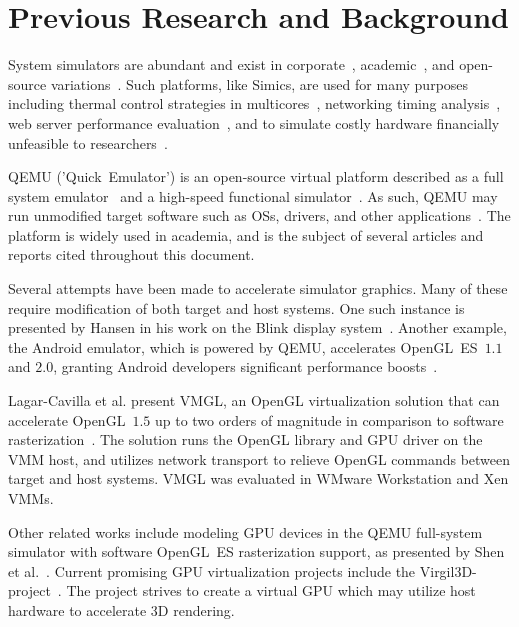 
\section{Previous Research and Background}
\label{sec:previousresearch}
System simulators are abundant and exist in corporate~, academic~, and open-source variations~.
Such platforms, like Simics, are used for many purposes including thermal control strategies in multicores~, networking timing analysis~, web server performance evaluation~, and to simulate costly hardware financially unfeasible to researchers~.

QEMU ('Quick~Emulator') is an open-source virtual platform described as a full system emulator~ and a high-speed functional simulator~.
As such, QEMU may run unmodified target software such as OSs, drivers, and other applications~.
The platform is widely used in academia, and is the subject of several articles and reports cited throughout this document.

Several attempts have been made to accelerate simulator graphics.
Many of these require modification of both target and host systems.
One such instance is presented by Hansen in his work on the Blink display system~.
Another example, the Android emulator, which is powered by QEMU, accelerates OpenGL~ES~$1.1$ and $2.0$, granting Android developers significant performance boosts~.

Lagar-Cavilla et al. present VMGL, an OpenGL virtualization solution that can accelerate OpenGL~$1.5$ up to two orders of magnitude in comparison to software rasterization~.
The solution runs the OpenGL library and GPU driver on the VMM host, and utilizes network transport to relieve OpenGL commands between target and host systems.
VMGL was evaluated in WMware Workstation and Xen VMMs.

Other related works include modeling GPU devices in the QEMU full-system simulator with software OpenGL~ES rasterization support, as presented by Shen et al.~.
Current promising GPU virtualization projects include the Virgil3D-project~.
The project strives to create a virtual GPU which may utilize host hardware to accelerate 3D rendering.

